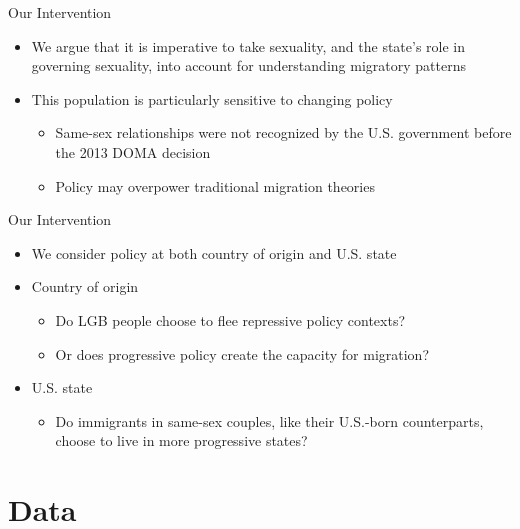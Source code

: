 \documentclass[
  ignorenonframetext,
]{beamer}
\providecommand{\tightlist}{%
  \setlength{\itemsep}{0pt}\setlength{\parskip}{0pt}}
\begin{document}
\begin{frame}{Our Intervention}
\protect\hypertarget{our-intervention}{}
\begin{itemize}
\tightlist
\item
  We argue that it is imperative to take sexuality, and the state's role
  in governing sexuality, into account for understanding migratory
  patterns
\item
  This population is particularly sensitive to changing policy

  \begin{itemize}
  \tightlist
  \item
    Same-sex relationships were not recognized by the U.S. government
    before the 2013 DOMA decision
  \item
    Policy may overpower traditional migration theories
  \end{itemize}
\end{itemize}
\end{frame}

\begin{frame}{Our Intervention}
\protect\hypertarget{our-intervention-1}{}
\begin{itemize}
\tightlist
\item
  We consider policy at both country of origin and U.S. state
\item
  Country of origin

  \begin{itemize}
  \tightlist
  \item
    Do LGB people choose to flee repressive policy contexts?
  \item
    Or does progressive policy create the capacity for migration?
  \end{itemize}
\item
  U.S. state

  \begin{itemize}
  \tightlist
  \item
    Do immigrants in same-sex couples, like their U.S.-born
    counterparts, choose to live in more progressive states?
  \end{itemize}
\end{itemize}
\end{frame}

\hypertarget{data}{%
\section{Data}\label{data}}
\end{document}
